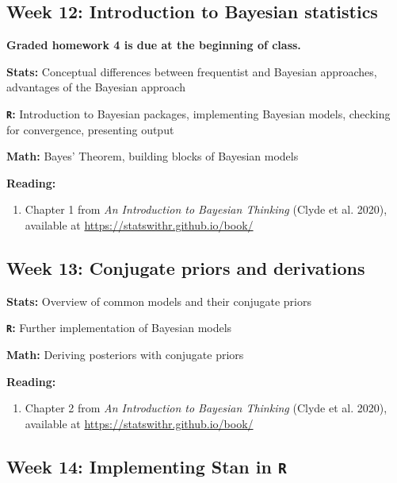 \documentclass[12pt]{article}
\begin{document}
\subsection*{Week 12: Introduction to Bayesian statistics}

\noindent \textbf{Graded homework 4 is due at the beginning of class.}

\noindent \textbf{Stats:} Conceptual differences between frequentist and Bayesian approaches, advantages of the Bayesian approach

\noindent \textbf{\texttt{R}:} Introduction to Bayesian packages, implementing Bayesian models, checking for convergence, presenting output

\noindent \textbf{Math:} Bayes' Theorem, building blocks of Bayesian models

\noindent \textbf{Reading:}

\begin{enumerate}[1)]

\item Chapter 1 from \emph{An Introduction to Bayesian Thinking} (Clyde et al. 2020), available at \href{https://statswithr.github.io/book/}{https://statswithr.github.io/book/}

\end{enumerate}

\subsection*{Week 13: Conjugate priors and derivations}

\noindent \textbf{Stats:} Overview of common models and their conjugate priors

\noindent \textbf{\texttt{R}:} Further implementation of Bayesian models

\noindent \textbf{Math:} Deriving posteriors with conjugate priors

\noindent \textbf{Reading:}

\begin{enumerate}[1)]

\item Chapter 2 from \emph{An Introduction to Bayesian Thinking} (Clyde et al. 2020), available at \href{https://statswithr.github.io/book/}{https://statswithr.github.io/book/}

\end{enumerate}

\subsection*{Week 14: Implementing Stan in \texttt{R}}
\end{document}
